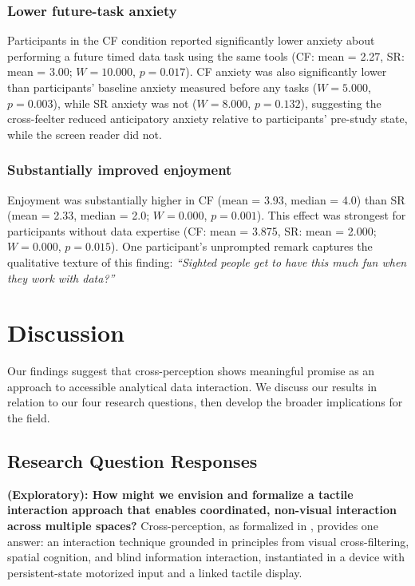 \documentclass[12pt]{cmuthesis}
\begin{document}
\subsubsection{Lower future-task anxiety}

Participants in the CF condition reported significantly lower anxiety about performing a future timed data task using the same tools (CF: mean = 2.27, SR: mean = 3.00; $W = 10.000$, $p = 0.017$). CF anxiety was also significantly lower than participants' baseline anxiety measured before any tasks ($W = 5.000$, $p = 0.003$), while SR anxiety was not ($W = 8.000$, $p = 0.132$), suggesting the cross-feelter reduced anticipatory anxiety relative to participants' pre-study state, while the screen reader did not.

\subsubsection{Substantially improved enjoyment}

Enjoyment was substantially higher in CF (mean = 3.93, median = 4.0) than SR (mean = 2.33, median = 2.0; $W = 0.000$, $p = 0.001$). This effect was strongest for participants without data expertise (CF: mean = 3.875, SR: mean = 2.000; $W = 0.000$, $p = 0.015$). One participant's unprompted remark captures the qualitative texture of this finding: \textit{``Sighted people get to have this much fun when they work with data?''} 


\section{Discussion}
\label{sec:discussion}


Our findings suggest that cross-perception shows meaningful promise as an approach to accessible analytical data interaction. We discuss our results in relation to our four research questions, then develop the broader implications for the field. 


\subsection{Research Question Responses}
\label{sec:rq-responses}


\textbf{ (Exploratory): How might we envision and formalize a tactile interaction approach that enables coordinated, non-visual interaction across multiple spaces?} Cross-perception, as formalized in , provides one answer: an interaction technique grounded in principles from visual cross-filtering, spatial cognition, and blind information interaction, instantiated in a device with persistent-state motorized input and a linked tactile
display.
\end{document}
